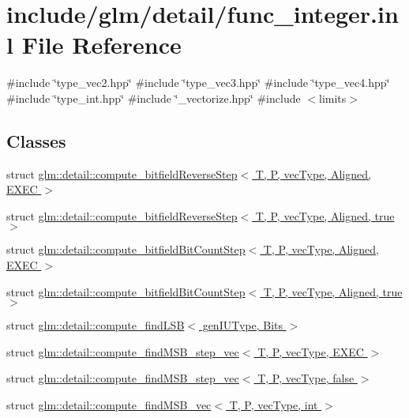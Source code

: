 \hypertarget{func__integer_8inl}{}\section{include/glm/detail/func\+\_\+integer.inl File Reference}
\label{func__integer_8inl}
{\ttfamily \#include \char`\"{}type\+\_\+vec2.\+hpp\char`\"{}}\newline
{\ttfamily \#include \char`\"{}type\+\_\+vec3.\+hpp\char`\"{}}\newline
{\ttfamily \#include \char`\"{}type\+\_\+vec4.\+hpp\char`\"{}}\newline
{\ttfamily \#include \char`\"{}type\+\_\+int.\+hpp\char`\"{}}\newline
{\ttfamily \#include \char`\"{}\+\_\+vectorize.\+hpp\char`\"{}}\newline
{\ttfamily \#include $<$limits$>$}\newline
\subsection*{Classes}
\begin{DoxyCompactItemize}
\item 
struct \hyperlink{structglm_1_1detail_1_1compute__bitfieldReverseStep}{glm\+::detail\+::compute\+\_\+bitfield\+Reverse\+Step$<$ T, P, vec\+Type, Aligned, E\+X\+E\+C $>$}
\item 
struct \hyperlink{structglm_1_1detail_1_1compute__bitfieldReverseStep_3_01T_00_01P_00_01vecType_00_01Aligned_00_01true_01_4}{glm\+::detail\+::compute\+\_\+bitfield\+Reverse\+Step$<$ T, P, vec\+Type, Aligned, true $>$}
\item 
struct \hyperlink{structglm_1_1detail_1_1compute__bitfieldBitCountStep}{glm\+::detail\+::compute\+\_\+bitfield\+Bit\+Count\+Step$<$ T, P, vec\+Type, Aligned, E\+X\+E\+C $>$}
\item 
struct \hyperlink{structglm_1_1detail_1_1compute__bitfieldBitCountStep_3_01T_00_01P_00_01vecType_00_01Aligned_00_01true_01_4}{glm\+::detail\+::compute\+\_\+bitfield\+Bit\+Count\+Step$<$ T, P, vec\+Type, Aligned, true $>$}
\item 
struct \hyperlink{structglm_1_1detail_1_1compute__findLSB}{glm\+::detail\+::compute\+\_\+find\+L\+S\+B$<$ gen\+I\+U\+Type, Bits $>$}
\item 
struct \hyperlink{structglm_1_1detail_1_1compute__findMSB__step__vec}{glm\+::detail\+::compute\+\_\+find\+M\+S\+B\+\_\+step\+\_\+vec$<$ T, P, vec\+Type, E\+X\+E\+C $>$}
\item 
struct \hyperlink{structglm_1_1detail_1_1compute__findMSB__step__vec_3_01T_00_01P_00_01vecType_00_01false_01_4}{glm\+::detail\+::compute\+\_\+find\+M\+S\+B\+\_\+step\+\_\+vec$<$ T, P, vec\+Type, false $>$}
\item 
struct \hyperlink{structglm_1_1detail_1_1compute__findMSB__vec}{glm\+::detail\+::compute\+\_\+find\+M\+S\+B\+\_\+vec$<$ T, P, vec\+Type, int $>$}
\end{DoxyCompactItemize}
